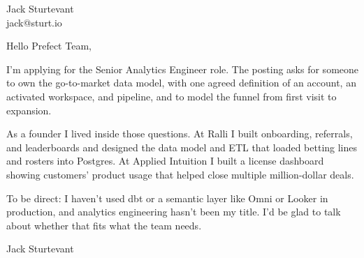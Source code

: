 \documentclass[11pt]{article}
\begin{document}
\raggedright

{\namefont\fontsize{20pt}{24pt}\selectfont Jack Sturtevant}\\[-0.3em]
jack@sturt.io

\vspace{1.2em}

Hello Prefect Team,

I'm applying for the Senior Analytics Engineer role. The posting asks for someone to own the go-to-market data model, with one agreed definition of an account, an activated workspace, and pipeline, and to model the funnel from first visit to expansion.

As a founder I lived inside those questions. At Ralli I built onboarding, referrals, and leaderboards and designed the data model and ETL that loaded betting lines and rosters into Postgres. At Applied Intuition I built a license dashboard showing customers' product usage that helped close multiple million-dollar deals.

To be direct: I haven't used dbt or a semantic layer like Omni or Looker in production, and analytics engineering hasn't been my title. I'd be glad to talk about whether that fits what the team needs.

\vspace{0.6em}
Jack Sturtevant
\end{document}
